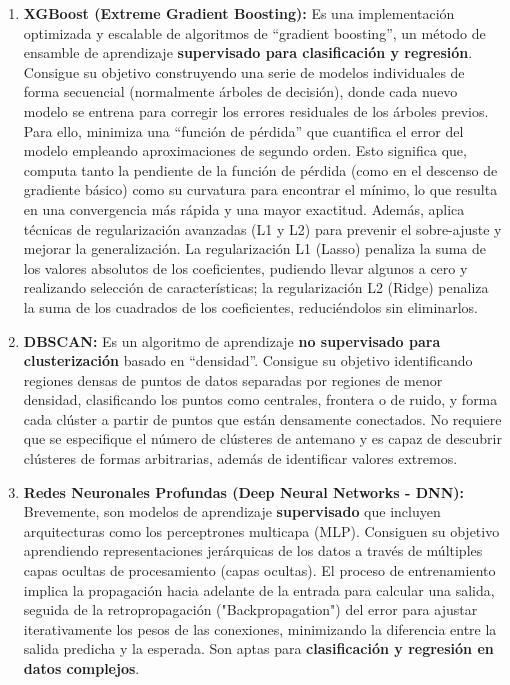 \begin{enumerate}
\begin{enumerate}
\begin{enumerate}
		\item \textbf{XGBoost (Extreme Gradient Boosting):}
		Es una implementación optimizada y escalable de algoritmos de ``gradient boosting'', un método de ensamble de aprendizaje \textbf{supervisado para clasificación y regresión}. Consigue su objetivo construyendo una serie de modelos individuales de forma secuencial (normalmente árboles de decisión), donde cada nuevo modelo se entrena para corregir los errores residuales de los árboles previos. Para ello, minimiza una ``función de pérdida'' que cuantifica el error del modelo empleando aproximaciones de segundo orden. Esto significa que, computa tanto la pendiente de la función de pérdida (como en el descenso de gradiente básico) como su curvatura para encontrar el mínimo, lo que resulta en una convergencia más rápida y una mayor exactitud. Además, aplica técnicas de regularización avanzadas (L1 y L2) para prevenir el sobre-ajuste y mejorar la generalización. La regularización L1 (Lasso) penaliza la suma de los valores absolutos de los coeficientes, pudiendo llevar algunos a cero y realizando selección de características; la regularización L2 (Ridge) penaliza la suma de los cuadrados de los coeficientes, reduciéndolos sin eliminarlos.
		
		\item \textbf{DBSCAN:}
		Es un algoritmo de aprendizaje \textbf{no supervisado para clusterización} basado en ``densidad''. Consigue su objetivo identificando regiones densas de puntos de datos separadas por regiones de menor densidad, clasificando los puntos como centrales, frontera o de ruido, y forma cada clúster a partir de puntos que están densamente conectados. No requiere que se especifique el número de clústeres de antemano y es capaz de descubrir clústeres de formas arbitrarias, además de identificar valores extremos.
		
		\item \textbf{Redes Neuronales Profundas (Deep Neural Networks - DNN):}
		Brevemente, son modelos de aprendizaje \textbf{supervisado} que incluyen arquitecturas como los perceptrones multicapa (MLP). Consiguen su objetivo aprendiendo representaciones jerárquicas de los datos a través de múltiples capas ocultas de procesamiento (capas ocultas). El proceso de entrenamiento implica la propagación hacia adelante de la entrada para calcular una salida, seguida de la retropropagación ("Backpropagation") del error para ajustar iterativamente los pesos de las conexiones, minimizando la diferencia entre la salida predicha y la esperada. Son aptas para \textbf{clasificación y regresión en datos complejos}. \cite{Brownlee2018, Sarker2021}
		

\end{enumerate}
\end{enumerate}
\end{enumerate}
